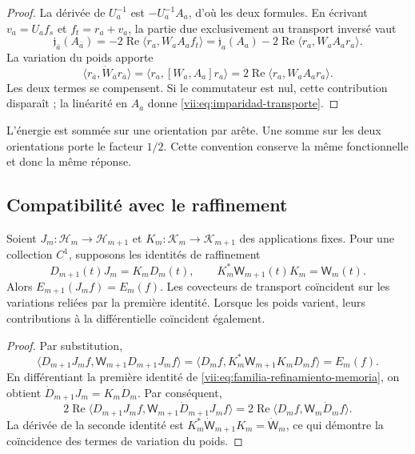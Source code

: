 \begin{proof}
La dérivée de \(U_a^{-1}\) est \(-U_a^{-1}A_a\), d'où les deux formules. En écrivant \(v_a=U_af_s\) et \(f_t=r_a+v_a\), la partie due exclusivement au transport inversé vaut
\[
 \mathfrak j_{\bar a}(A_{\bar a})
 =-2\operatorname{Re}\langle r_a,W_aA_af_t\rangle
 =\mathfrak j_a(A_a)
   -2\operatorname{Re}\langle r_a,W_aA_ar_a\rangle.
\]
La variation du poids apporte
\[
 \langle r_{\bar a},\dot W_{\bar a}r_{\bar a}\rangle
 =\langle r_a,[W_a,A_a]r_a\rangle
 =2\operatorname{Re}\langle r_a,W_aA_ar_a\rangle.
\]
Les deux termes se compensent. Si le commutateur est nul, cette contribution
disparaît ; la linéarité en \(A_a\) donne
\eqref{vii:eq:imparidad-transporte}.
\end{proof}

L'énergie est sommée sur une orientation par arête. Une somme sur les deux
orientations porte le facteur \(1/2\). Cette convention conserve la même
fonctionnelle et donc la même réponse.

\subsection{Compatibilité avec le raffinement}
\label{vii:subsec:refinamiento-respuesta}

\begin{theorem}
\label{vii:thm:refinamiento-respuesta}
Soient \(J_m:\mathcal H_m\to\mathcal H_{m+1}\) et \(K_m:\mathcal K_m\to\mathcal K_{m+1}\) des applications fixes. Pour une collection \(C^1\), supposons les identités de raffinement
\begin{equation}
 D_{m+1}(t)J_m=K_mD_m(t),\qquad
 K_m^*\mathsf W_{m+1}(t)K_m=\mathsf W_m(t).
 \label{vii:eq:familia-refinamiento-memoria}
\end{equation}
Alors \(E_{m+1}(J_mf)=E_m(f)\). Les covecteurs de transport coïncident sur les variations reliées par la première identité. Lorsque les poids varient, leurs contributions à la différentielle coïncident également.
\end{theorem}

\begin{proof}
Par substitution,
\[
 \langle D_{m+1}J_mf,\mathsf W_{m+1}D_{m+1}J_mf\rangle
 =\langle D_mf,K_m^*\mathsf W_{m+1}K_mD_mf\rangle=E_m(f).
\]
En différentiant la première identité de
\eqref{vii:eq:familia-refinamiento-memoria}, on obtient
\(\dot D_{m+1}J_m=K_m\dot D_m\). Par conséquent,
\[
 2\operatorname{Re}
 \langle D_{m+1}J_mf,\mathsf W_{m+1}\dot D_{m+1}J_mf\rangle
 =2\operatorname{Re}\langle D_mf,\mathsf W_m\dot D_mf\rangle.
\]
La dérivée de la seconde identité est
\(K_m^*\dot{\mathsf W}_{m+1}K_m=\dot{\mathsf W}_m\), ce qui démontre
la coïncidence des termes de variation du poids.
\end{proof}

